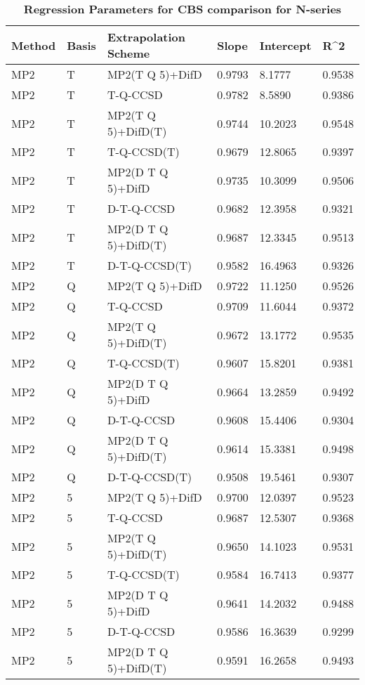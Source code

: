 \begin{table}
  \caption{\textbf{Regression Parameters for CBS comparison for N-series}}
  \label{tbl:regression-two-n}
  \begin{tabular}{l l l l l l }
    \hline
    Method & Basis & Extrapolation Scheme & Slope & Intercept & R^2 \\ 
    \hline
    MP2 & T & MP2(T Q 5)+DifD & 0.9793 & 8.1777 & 0.9538 \\ 
    MP2 & T & T-Q-CCSD & 0.9782 & 8.5890 & 0.9386 \\ 
    MP2 & T & MP2(T Q 5)+DifD(T) & 0.9744 & 10.2023 & 0.9548 \\ 
    MP2 & T & T-Q-CCSD(T) & 0.9679 & 12.8065 & 0.9397 \\ 
    MP2 & T & MP2(D T Q 5)+DifD & 0.9735 & 10.3099 & 0.9506 \\ 
    MP2 & T & D-T-Q-CCSD & 0.9682 & 12.3958 & 0.9321 \\ 
    MP2 & T & MP2(D T Q 5)+DifD(T) & 0.9687 & 12.3345 & 0.9513 \\ 
    MP2 & T & D-T-Q-CCSD(T) & 0.9582 & 16.4963 & 0.9326 \\ 
    MP2 & Q & MP2(T Q 5)+DifD & 0.9722 & 11.1250 & 0.9526 \\ 
    MP2 & Q & T-Q-CCSD & 0.9709 & 11.6044 & 0.9372 \\ 
    MP2 & Q & MP2(T Q 5)+DifD(T) & 0.9672 & 13.1772 & 0.9535 \\ 
    MP2 & Q & T-Q-CCSD(T) & 0.9607 & 15.8201 & 0.9381 \\ 
    MP2 & Q & MP2(D T Q 5)+DifD & 0.9664 & 13.2859 & 0.9492 \\ 
    MP2 & Q & D-T-Q-CCSD & 0.9608 & 15.4406 & 0.9304 \\ 
    MP2 & Q & MP2(D T Q 5)+DifD(T) & 0.9614 & 15.3381 & 0.9498 \\ 
    MP2 & Q & D-T-Q-CCSD(T) & 0.9508 & 19.5461 & 0.9307 \\ 
    MP2 & 5 & MP2(T Q 5)+DifD & 0.9700 & 12.0397 & 0.9523 \\ 
    MP2 & 5 & T-Q-CCSD & 0.9687 & 12.5307 & 0.9368 \\ 
    MP2 & 5 & MP2(T Q 5)+DifD(T) & 0.9650 & 14.1023 & 0.9531 \\ 
    MP2 & 5 & T-Q-CCSD(T) & 0.9584 & 16.7413 & 0.9377 \\ 
    MP2 & 5 & MP2(D T Q 5)+DifD & 0.9641 & 14.2032 & 0.9488 \\ 
    MP2 & 5 & D-T-Q-CCSD & 0.9586 & 16.3639 & 0.9299 \\ 
    MP2 & 5 & MP2(D T Q 5)+DifD(T) & 0.9591 & 16.2658 & 0.9493 \\ 

\end{tabular}
\end{table}
